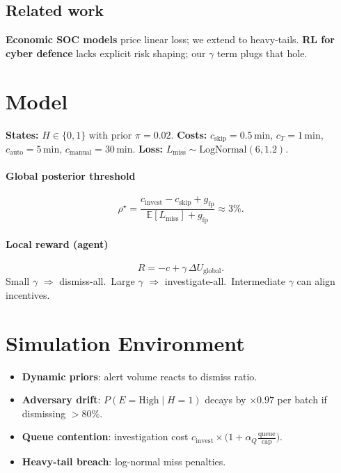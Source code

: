 \documentclass[11pt]{article}
\begin{document}
\subsection{Related work}
\textbf{Economic SOC models}\cite{gonzalez2023soc}
price linear loss; we extend to heavy-tails.
\textbf{RL for cyber defence}\cite{austin2024rlsoc}
lacks explicit risk shaping; our $\gamma$ term plugs that hole.

\section{Model}
\textbf{States:} $H\!\in\!\{0,1\}$ with prior $\pi=0.02$.  
\textbf{Costs:} $c_{\!\text{skip}}{=}0.5$\,min,
$c_T{=}1$\,min,
$c_{\!\text{auto}}{=}5$\,min,
$c_{\!\text{manual}}{=}30$\,min.  
\textbf{Loss:} $L_{\text{miss}}\!\sim\!\text{LogNormal}(6,1.2)$.

\paragraph{Global posterior threshold}
\[
\rho^\star=\frac{c_{\!\text{invest}}-c_{\!\text{skip}}+g_{\!\text{fp}}}
                 {\,\mathbb{E}[L_{\text{miss}}]+g_{\!\text{fp}}\,}\approx 3\%.
\]

\paragraph{Local reward (agent)}
\[
R = -c + \gamma\,\Delta U_{\text{global}}.
\]
Small $\gamma$   $\Rightarrow$ dismiss-all.\
Large $\gamma$   $\Rightarrow$ investigate-all.\
Intermediate $\gamma$ can align incentives.

\section{Simulation Environment}
\begin{itemize}
\item \textbf{Dynamic priors}: alert volume reacts to dismiss ratio.
\item \textbf{Adversary drift}: $P(E=\text{High}\mid H{=}1)$ decays
      by $\times0.97$ per batch if dismissing $>80\%$.
\item \textbf{Queue contention}: investigation cost
      $c_{\!\text{invest}}\!\times\!
      \bigl(1+\alpha_Q\frac{\text{queue}}{\text{cap}}\bigr)$.
\item \textbf{Heavy-tail breach}: log-normal miss penalties.
\end{itemize}
\end{document}
